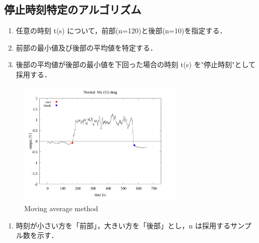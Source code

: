\documentclass[twocolumn,a4j]{jsarticle}
\begin{document}
\subsection{停止時刻特定のアルゴリズム}
\begin{enumerate}[(1)]
    \item 任意の時刻 t(s) について，前部(n=120)と後部(n=10)を指定する．
    \item 前部の最小値及び後部の平均値を特定する．
    \item 後部の平均値が後部の最小値を下回った場合の時刻 t(s) を"停止時刻"として採用する．
\end{enumerate}
\begin{figure}[htbp]
    \footnotesize
    \begin{center}
        \includegraphics[width=80mm]{images/Normal_ma(11)_drag_02.png}
        \caption{Moving average method}
    \end{center}
\end{figure}
\begin{enumerate}[※]
    \item 時刻が小さい方を「前部」，大きい方を「後部」とし，n は採用するサンプル数を示す．
\end{enumerate}
\end{document}
